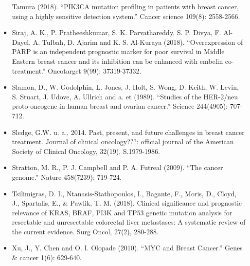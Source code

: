 \documentclass[]{article}
\begin{document}
\begin{itemize}
  Tamura (2018). ``PIK3CA mutation profiling in patients with breast
  cancer, using a highly sensitive detection system.'' Cancer science
  109(8): 2558-2566.
\item
  Siraj, A. K., P. Pratheeshkumar, S. K. Parvathareddy, S. P. Divya, F.
  Al-Dayel, A. Tulbah, D. Ajarim and K. S. Al-Kuraya (2018).
  ``Overexpression of PARP is an independent prognostic marker for poor
  survival in Middle Eastern breast cancer and its inhibition can be
  enhanced with embelin co-treatment.'' Oncotarget 9(99): 37319-37332.
\item
  Slamon, D., W. Godolphin, L. Jones, J. Holt, S. Wong, D. Keith, W.
  Levin, S. Stuart, J. Udove, A. Ullrich and a. et (1989). ``Studies of
  the HER-2/neu proto-oncogene in human breast and ovarian cancer.''
  Science 244(4905): 707-712.
\item
  Sledge, G.W. u. a., 2014. Past, present, and future challenges in
  breast cancer treatment. Journal of clinical oncology???: official
  journal of the American Society of Clinical Oncology, 32(19),
  S.1979-1986.
\item
  Stratton, M. R., P. J. Campbell and P. A. Futreal (2009). ``The cancer
  genome.'' Nature 458(7239): 719-724.
\item
  Tsilimigras, D. I., Ntanasis-Stathopoulos, I., Bagante, F., Moris, D.,
  Cloyd, J., Spartalis, E., \& Pawlik, T. M. (2018). Clinical
  significance and prognostic relevance of KRAS, BRAF, PI3K and TP53
  genetic mutation analysis for resectable and unresectable colorectal
  liver metastases: A systematic review of the current evidence. Surg
  Oncol, 27(2), 280-288.
\item
  Xu, J., Y. Chen and O. I. Olopade (2010). ``MYC and Breast Cancer.''
  Genes \& cancer 1(6): 629-640.
\end{itemize}
\end{document}
